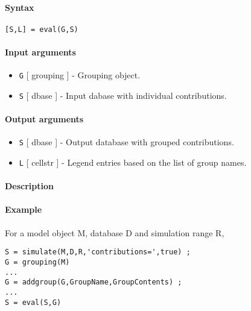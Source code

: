 


	\paragraph{Syntax}\label{syntax}

\begin{verbatim}
[S,L] = eval(G,S)
\end{verbatim}

\paragraph{Input arguments}\label{input-arguments}

\begin{itemize}
\item
  \texttt{G} {[} grouping {]} - Grouping object.
\item
  \texttt{S} {[} dbase {]} - Input dabase with individual contributions.
\end{itemize}

\paragraph{Output arguments}\label{output-arguments}

\begin{itemize}
\item
  \texttt{S} {[} dbase {]} - Output database with grouped contributions.
\item
  \texttt{L} {[} cellstr {]} - Legend entries based on the list of group
  names.
\end{itemize}

\paragraph{Description}\label{description}

\paragraph{Example}\label{example}

For a model object M, database D and simulation range R,

\begin{verbatim}
S = simulate(M,D,R,'contributions=',true) ;
G = grouping(M)
...
G = addgroup(G,GroupName,GroupContents) ;
...
S = eval(S,G)
\end{verbatim}



